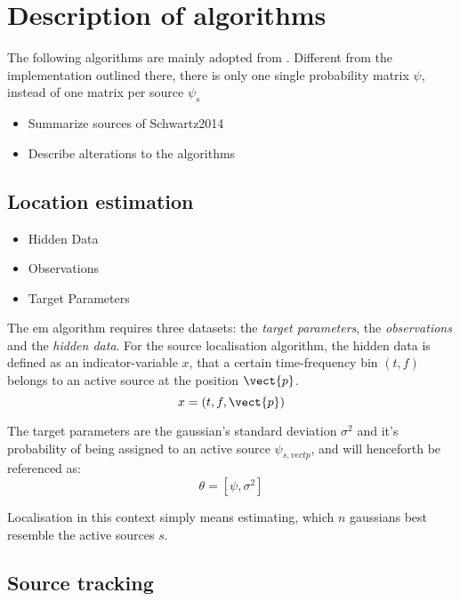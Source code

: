 \chapter{Description of algorithms}
\label{chap:algorithms}
The following algorithms are mainly adopted from \cite{Schwartz2014}. Different from the implementation outlined there, there is only one single probability matrix $\psi$, instead of one matrix per source $\psi_{s}$
\begin{itemize}
	\item Summarize sources of Schwartz2014
	\item Describe alterations to the algorithms
\end{itemize}

\section{Location estimation}
\label{sec:algLocEst}
\begin{itemize}
	\item Hidden Data
	\item Observations
	\item Target Parameters
\end{itemize}

The \gls{em} algorithm requires three datasets: the \emph{target parameters}, the \emph{observations} and the \emph{hidden data}. For the source localisation algorithm, the hidden data is defined as an indicator-variable $x$, that a certain time-frequency bin $(t,f)$ belongs to an active source at the position $\vect{p}$. 
\begin{equation}
	x=(t,f,\vect{p})
\end{equation}

The target parameters are the gaussian's standard deviation $\sigma^2$ and it's probability of being assigned to an active source $\psi_{s,vect{p}}$, and will henceforth be referenced as:
\begin{equation}
	\theta=[\psi, \sigma^2]
\end{equation}

Localisation in this context simply means estimating, which $n$ gaussians best resemble the active sources $s$.

\section{Source tracking}
\label{sec:algSrcTrack}


